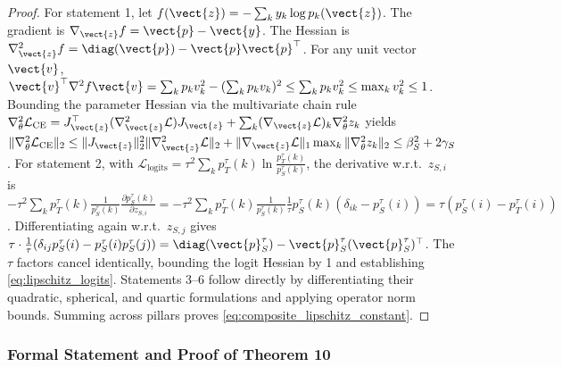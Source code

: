 \begin{proof}
For statement 1, let $f(\vect{z}) = - \sum_k y_k \log p_k(\vect{z})$. The gradient is $\nabla_{\vect{z}} f = \vect{p} - \vect{y}$. The Hessian is $\nabla_{\vect{z}}^2 f = \diag(\vect{p}) - \vect{p} \vect{p}^\top$. For any unit vector $\vect{v}$, $\vect{v}^\top \nabla^2 f \vect{v} = \sum_k p_k v_k^2 - (\sum_k p_k v_k)^2 \le \sum_k p_k v_k^2 \le \max_k v_k^2 \le 1$. Bounding the parameter Hessian via the multivariate chain rule $\nabla_\theta^2 \mathcal{L}_{\text{CE}} = J_{\vect{z}}^\top (\nabla_{\vect{z}}^2 \mathcal{L}) J_{\vect{z}} + \sum_k (\nabla_{\vect{z}} \mathcal{L})_k \nabla_\theta^2 z_k$ yields $\|\nabla_\theta^2 \mathcal{L}_{\text{CE}}\|_2 \le \|J_{\vect{z}}\|_2^2 \|\nabla_{\vect{z}}^2 \mathcal{L}\|_2 + \|\nabla_{\vect{z}} \mathcal{L}\|_1 \max_k \|\nabla_\theta^2 z_k\|_2 \le \beta_S^2 + 2\gamma_S$.
For statement 2, with $\mathcal{L}_{\text{logits}} = \tau^2 \sum_k p_T^\tau(k) \ln \frac{p_T^\tau(k)}{p_S^\tau(k)}$, the derivative w.r.t.\ $z_{S, i}$ is $-\tau^2 \sum_k p_T^\tau(k) \frac{1}{p_S^\tau(k)} \frac{\partial p_S^\tau(k)}{\partial z_{S, i}} = -\tau^2 \sum_k p_T^\tau(k) \frac{1}{p_S^\tau(k)} \frac{1}{\tau} p_S^\tau(k) (\delta_{ik} - p_S^\tau(i)) = \tau (p_S^\tau(i) - p_T^\tau(i))$. Differentiating again w.r.t.\ $z_{S, j}$ gives $\tau \cdot \frac{1}{\tau} (\delta_{ij} p_S^\tau(i) - p_S^\tau(i) p_S^\tau(j)) = \diag(\vect{p}_S^\tau) - \vect{p}_S^\tau (\vect{p}_S^\tau)^\top$. The $\tau$ factors cancel identically, bounding the logit Hessian by 1 and establishing \eqref{eq:lipschitz_logits}.
Statements 3--6 follow directly by differentiating their quadratic, spherical, and quartic formulations and applying operator norm bounds. Summing across pillars proves \eqref{eq:composite_lipschitz_constant}.
\end{proof}

\subsubsection{Formal Statement and Proof of Theorem 10}

